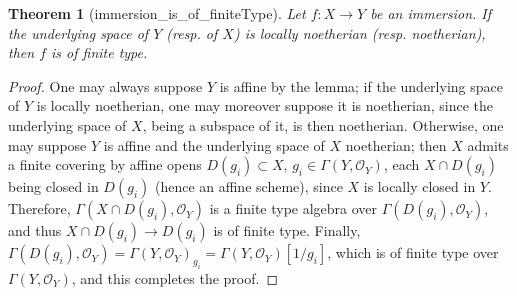 \documentclass{article}
\newtheorem{theorem}{Theorem}
\begin{document}
\begin{theorem}[immersion_is_of_finiteType]
Let \(f : X \to Y\) be an immersion. If the underlying space of \(Y\) (resp. of \(X\)) is locally noetherian (resp. noetherian), then \(f\) is of finite type.
\end{theorem}

\begin{proof}
One may always suppose \(Y\) is affine by the lemma; if the underlying space of \(Y\) is locally noetherian, one may moreover suppose it is noetherian, since the underlying space of \(X\), being a subspace of it, is then noetherian. Otherwise, one may suppose \(Y\) is affine and the underlying space of \(X\) noetherian; then \(X\) admits a finite covering by affine opens \(D(g_i)\subset X\), \(g_i\in \Gamma(Y,\mathcal{O}_Y)\), each \(X\cap D(g_i)\) being closed in \(D(g_i)\) (hence an affine scheme), since \(X\) is locally closed in \(Y\). Therefore, \(\Gamma(X\cap D(g_i),\mathcal{O}_Y)\) is a finite type algebra over \(\Gamma(D(g_i),\mathcal{O}_Y)\), and thus \(X\cap D(g_i)\to D(g_i)\) is of finite type. Finally, \(\Gamma(D(g_i),\mathcal{O}_Y)=\Gamma(Y,\mathcal{O}_Y)_{g_i}=\Gamma(Y,\mathcal{O}_Y)[1/g_i]\), which is of finite type over \(\Gamma(Y,\mathcal{O}_Y)\), and this completes the proof.
\end{proof}
\end{document}

